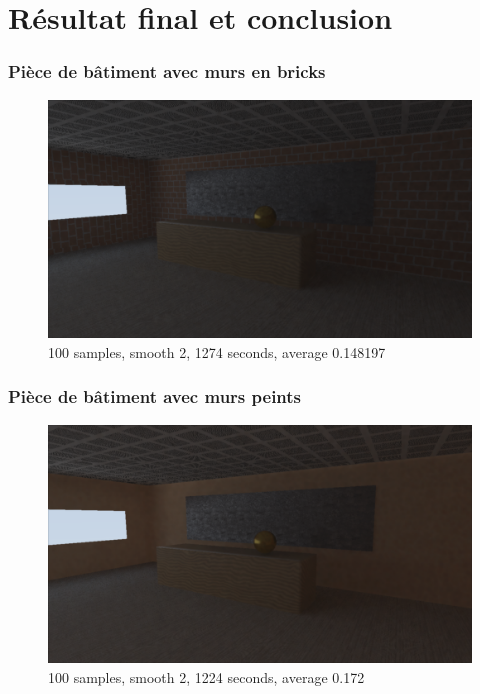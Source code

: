 \documentclass[handout]{beamer}
\begin{document}
\section{Résultat final et conclusion}

\begin{frame}
    \frametitle{Pièce de bâtiment avec murs en bricks}

    \begin{figure}
        \includegraphics[scale=0.25]{piece_bricks.png}
        \caption{100 samples, smooth 2, 1274 seconds, average 0.148197}
    \end{figure}

\end{frame}

\begin{frame}
    \frametitle{Pièce de bâtiment avec murs peints}

    \begin{figure}
        \includegraphics[scale=0.25]{piece_peinture.png}
        \caption{100 samples, smooth 2, 1224 seconds, average 0.172}
    \end{figure}

\end{frame}
\end{document}
